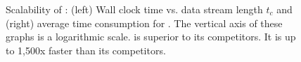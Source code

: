 \begin{figure}[t]
    \centering
    \vspace{-5ex}
    \caption{Scalability of \method: (left) Wall clock time vs. data stream length $t_c$ and (right) average time consumption for \pexercise.
    The vertical axis of these graphs is a logarithmic scale.
    \method is superior to its competitors.
    It is up to 1,500x faster than its competitors.}
    \label{fig:time}
    \vspace{0.8ex}
\end{figure}
